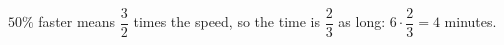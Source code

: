 $50\%$ faster means $\dfrac{3}{2}$ times the speed, so the time is $\dfrac{2}{3}$ as long: $6\cdot\dfrac{2}{3}=\boxed{4}$ minutes.
